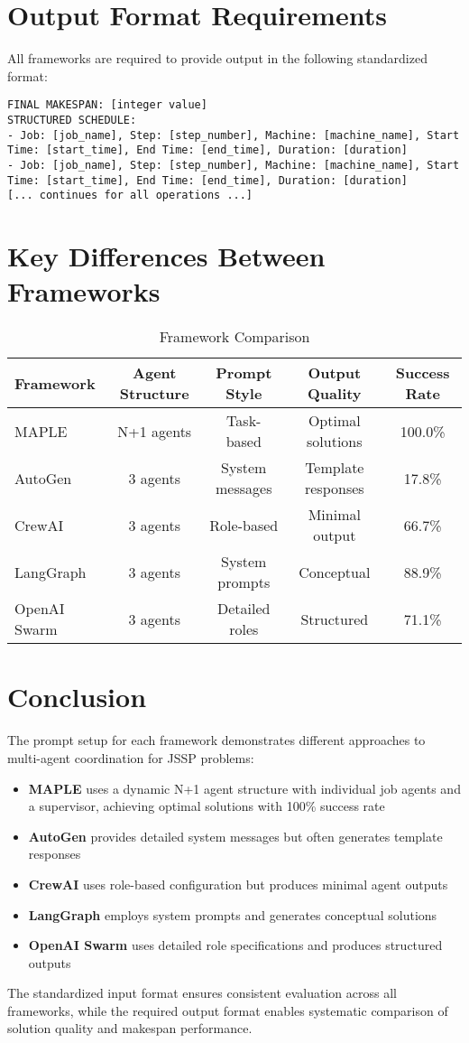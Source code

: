\documentclass[11pt]{article}
\begin{document}
\section{Output Format Requirements}

All frameworks are required to provide output in the following standardized format:

\begin{lstlisting}[caption=Required Output Format]
FINAL MAKESPAN: [integer value]
STRUCTURED SCHEDULE:
- Job: [job_name], Step: [step_number], Machine: [machine_name], Start Time: [start_time], End Time: [end_time], Duration: [duration]
- Job: [job_name], Step: [step_number], Machine: [machine_name], Start Time: [start_time], End Time: [end_time], Duration: [duration]
[... continues for all operations ...]
\end{lstlisting}

\section{Key Differences Between Frameworks}

\begin{table}[h]
\centering
\caption{Framework Comparison}
\begin{tabular}{|l|c|c|c|c|}
\hline
Framework & Agent Structure & Prompt Style & Output Quality & Success Rate \\
\hline
MAPLE & N+1 agents & Task-based & Optimal solutions & 100.0\% \\
AutoGen & 3 agents & System messages & Template responses & 17.8\% \\
CrewAI & 3 agents & Role-based & Minimal output & 66.7\% \\
LangGraph & 3 agents & System prompts & Conceptual & 88.9\% \\
OpenAI Swarm & 3 agents & Detailed roles & Structured & 71.1\% \\
\hline
\end{tabular}
\end{table}

\section{Conclusion}

The prompt setup for each framework demonstrates different approaches to multi-agent coordination for JSSP problems:

\begin{itemize}
    \item \textbf{MAPLE} uses a dynamic N+1 agent structure with individual job agents and a supervisor, achieving optimal solutions with 100\% success rate
    \item \textbf{AutoGen} provides detailed system messages but often generates template responses
    \item \textbf{CrewAI} uses role-based configuration but produces minimal agent outputs
    \item \textbf{LangGraph} employs system prompts and generates conceptual solutions
    \item \textbf{OpenAI Swarm} uses detailed role specifications and produces structured outputs
\end{itemize}

The standardized input format ensures consistent evaluation across all frameworks, while the required output format enables systematic comparison of solution quality and makespan performance.
\end{document}
